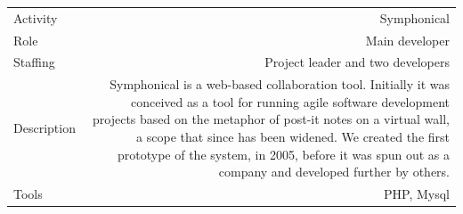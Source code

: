\documentclass[english,a4paper,11pt]{article}
\begin{document}
\begin{tabular}{@{}LR}
Activity & Symphonical \\
Role & Main developer \\
Staffing & Project leader and two developers \\
Description & Symphonical is a web-based collaboration tool. Initially it was conceived as a tool for running agile software development projects based on the metaphor of post-it notes on a virtual wall, a scope that since has been widened. We created the first prototype of the system, in 2005, before it was spun out as a company and developed further by others. \\
Tools & PHP, Mysql \\ 
\end{tabular}
\end{document}
